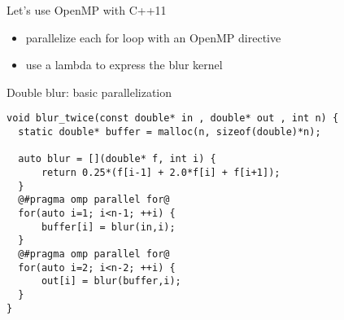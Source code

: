 \begin{frame}[fragile]{}
    \begin{info}{Let's use OpenMP with C++11}
        \begin{itemize}
            \item parallelize each for loop with an OpenMP directive
            \item use a lambda to express the blur kernel
        \end{itemize}
    \end{info}

    \begin{code}{Double blur: basic parallelization}
        \begin{lstlisting}[style=boxopenmptiny]
void blur_twice(const double* in , double* out , int n) {
  static double* buffer = malloc(n, sizeof(double)*n);

  auto blur = [](double* f, int i) {
      return 0.25*(f[i-1] + 2.0*f[i] + f[i+1]);
  }
  @#pragma omp parallel for@
  for(auto i=1; i<n-1; ++i) {
      buffer[i] = blur(in,i);
  }
  @#pragma omp parallel for@
  for(auto i=2; i<n-2; ++i) {
      out[i] = blur(buffer,i);
  }
}
        \end{lstlisting}
    \end{code}

\end{frame}
